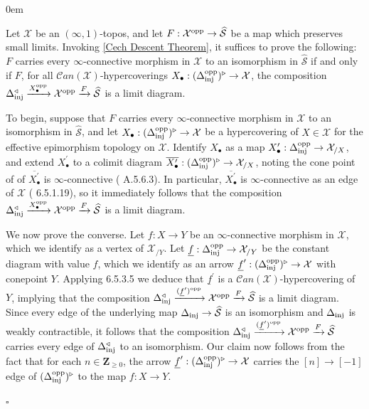\documentclass[10pt]{article}
\newcommand{\mS}{\mathcal S}
\newcommand{\C}{\mathcal C}
\newcommand{\cX}{\mathcal{X}}
\newcommand{\ZZ}{\mathbb{Z}}
\def\ZZ{{\mathbf Z}}
\renewcommand{\qed}{\hfill$\square$}
\renewenvironment{proof}{\begin{addmargin}[1em]{0em}\begin{newproof}}{\end{newproof}\end{addmargin}\qed}
\theoremstyle{witharg}
\theoremstyle{witharg}
\theoremstyle{witharg2}
\begin{document}
\begin{proof}

    Let $\cX$ be an $(\infty,1)$-topos, and let $F:\cX^{\textnormal{opp}}\rightarrow \widehat{\mS}$ be a map which preserves small limits. Invoking \ref{Cech Descent Theorem}, it suffices to prove the following: $F$ carries every $\infty$-connective morphism in $\cX$ to an isomorphism in $\widehat{\mS}$ if and only if $F$, for all $\C an(\cX)$-hypercoverings $X_\bullet:(\Delta^{\textnormal{opp}}_{\textnormal{inj}})^\triangleright\rightarrow \cX$, the composition $\Delta_{\textnormal{inj}}^\triangleleft\xrightarrow{X_\bullet^{\textnormal{opp}}}\cX^{\textnormal{opp}}\xrightarrow{F}\widehat{\mS}$ is a limit diagram. 

    To begin, suppose that $F$ carries every $\infty$-connective morphism in $\cX$ to an isomorphism in $\widehat{\mS}$, and let $X_\bullet:(\Delta^{\textnormal{opp}}_{\textnormal{inj}})^\triangleright\rightarrow \cX$ be a hypercovering of $X\in \cX$ for the effective epimorphism topology on $\cX$. Identify $X_\bullet$ as a map $X^\prime_\bullet:\Delta^{\textnormal{opp}}_{\textnormal{inj}}\rightarrow \cX_{/X}$, and extend $X^\prime_\bullet$ to a colimit diagram $\overline{X^\prime_\bullet}:(\Delta^{\textnormal{opp}}_{\textnormal{inj}})^\triangleright\rightarrow \cX_{/X}$, noting the cone point of of $\overline{X^\prime_\bullet}$ is $\infty$-connective ( A.5.6.3). In particular, $\overline{X^\prime_\bullet}$ is $\infty$-connective as an edge of $\cX$ ( 6.5.1.19), so it immediately follows that the composition $\Delta_{\textnormal{inj}}^\triangleleft\xrightarrow{X_\bullet^{\textnormal{opp}}}\cX^{\textnormal{opp}}\xrightarrow{F}\widehat{\mS}$ is a limit diagram.

    We now prove the converse. Let $f:X\rightarrow Y$ be an $\infty$-connective morphism in $\cX$, which we identify as a vertex of $\cX_{/Y}$. Let $\underline{f}:\Delta^{\textnormal{opp}}_{\textnormal{inj}}\rightarrow \cX_{/Y}$ be the constant diagram with value $f$, which we identify as an arrow $\underline{f}^\prime:(\Delta^{\textnormal{opp}}_{\textnormal{inj}})^\triangleright\rightarrow \cX$ with conepoint $Y$. Applying  6.5.3.5 we deduce that $\underline{f}^\prime$ is a $\C an(\cX)$-hypercovering of $Y$, implying that the composition $\Delta_{\textnormal{inj}}^\triangleleft\xrightarrow{(\underline{f}^\prime)^{\textnormal{opp}}}\cX^{\textnormal{opp}}\xrightarrow{F}\widehat{\mS}$ is a limit diagram. Since every edge of the underlying map $\Delta_{\textnormal{inj}}\rightarrow \widehat{\mS}$ is an isomorphism and $\Delta_{\textnormal{inj}}$ is weakly contractible, it follows that the composition $\Delta_{\textnormal{inj}}^\triangleleft\xrightarrow{(\underline{f}^\prime)^{\textnormal{opp}}}\cX^{\textnormal{opp}}\xrightarrow{F}\widehat{\mS}$ carries every edge of $\Delta_{\textnormal{inj}}^\triangleleft$ to an isomorphism. Our claim now follows from the fact that for each $n\in \ZZ_{\geq 0}$, the arrow $\underline{f}^\prime:(\Delta^{\textnormal{opp}}_{\textnormal{inj}})^\triangleright\rightarrow \cX$ carries the $[n]\rightarrow [-1]$ edge of $(\Delta^{\textnormal{opp}}_{\textnormal{inj}})^\triangleright$ to the map $f:X\rightarrow Y$. 
    

\end{proof}
\end{document}
